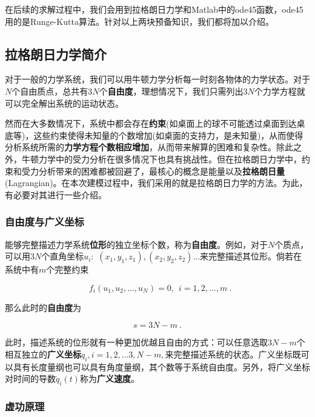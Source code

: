 \documentclass[a4paper,c5size,twoside,UTF8]{ctexart} %
\numberwithin{equation}{section}   %
\begin{document}
在后续的求解过程中，我们会用到拉格朗日力学和Matlab中的ode45函数，ode45用的是Runge-Kutta算法。针对以上两块预备知识，我们都将加以介绍。

\subsection{拉格朗日力学简介}

对于一般的力学系统，我们可以用牛顿力学分析每一时刻各物体的力学状态。对于$N$个自由质点，总共有$3N$个\textbf{自由度}，理想情况下，我们只需列出$3N$个力学方程就可以完全解出系统的运动状态。

然而在大多数情况下，系统中都会存在\textbf{约束}(如桌面上的球不可能透过桌面到达桌底等)，这些约束使得未知量的个数增加(如桌面的支持力，是未知量)，从而使得分析系统所需的\textbf{力学方程个数相应增加}，从而带来解算的困难和复杂性。除此之外，牛顿力学中的受力分析在很多情况下也具有挑战性。但在拉格朗日力学中，约束和受力分析带来的困难都被回避了，最核心的概念是能量以及\textbf{拉格朗日量}(Lagrangian)。在本次建模过程中，我们采用的就是拉格朗日力学的方法。为此，有必要对其进行一些介绍。

\subsubsection{自由度与广义坐标}

能够完整描述力学系统\textbf{位形}的独立坐标个数，称为\textbf{自由度}。例如，对于$N$个质点，可以用$3N$个直角坐标$u_i:$ $(x_1,y_1,z_1),(x_2,y_2,z_2)\dots$来完整描述其位形。倘若在系统中有$m$个完整约束

\begin{equation}
    ~~~ f_i(u_1,u_2,...,u_N)=0, ~~i=1,2,...,m~.
\end{equation}

那么此时的\textbf{自由度}为

\begin{equation}
            s= 3N-m~.
\end{equation}

此时，描述系统的位形就有一种更加优越且自由的方式：可以任意选取$3N-m$个相互独立的\textbf{广义坐标}$q_i , i=1,2,...3,N-m,$来完整描述系统的状态。广义坐标既可以具有长度量纲也可以具有角度量纲，其个数等于系统自由度。另外，将广义坐标对时间的导数$\dot{q}_i(t)$称为\textbf{广义速度}。

\subsubsection{虚功原理}
\end{document}
